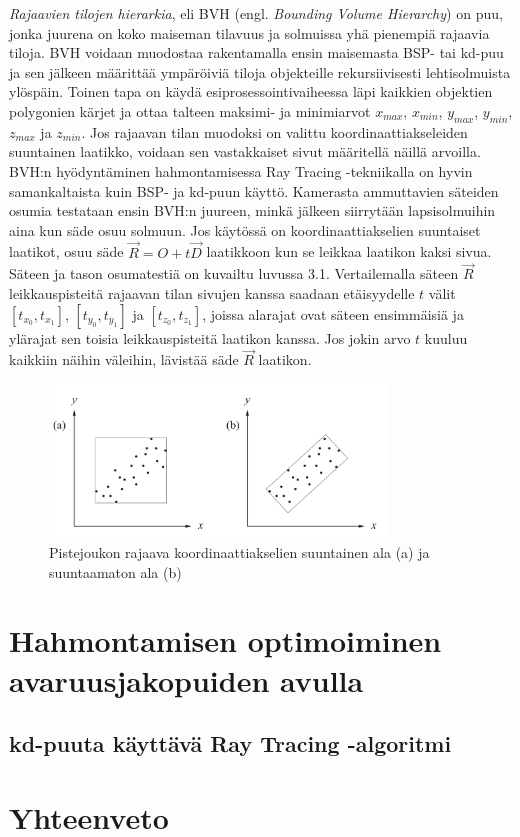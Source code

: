 \documentclass[a4paper, 12pt, titlepage]{article}
\begin{document}
\emph{Rajaavien tilojen hierarkia}, eli BVH (engl. \emph{Bounding Volume Hierarchy}) on puu, jonka juurena on koko maiseman tilavuus ja solmuissa yhä pienempiä rajaavia tiloja. BVH voidaan muodostaa rakentamalla ensin maisemasta BSP- tai kd-puu ja sen jälkeen määrittää ympäröiviä tiloja objekteille rekursiivisesti lehtisolmuista ylöspäin. \citep{hughes} Toinen tapa on käydä esiprosessointivaiheessa läpi kaikkien objektien polygonien kärjet ja ottaa talteen maksimi- ja minimiarvot $x_{max}$, $x_{min}$, $y_{max}$, $y_{min}$, $z_{max}$ ja $z_{min}$. Jos rajaavan tilan muodoksi on valittu koordinaattiakseleiden suuntainen laatikko, voidaan sen vastakkaiset sivut määritellä näillä arvoilla. \citep[.]{janke}\\

BVH:n hyödyntäminen hahmontamisessa Ray Tracing -tekniikalla on hyvin samankaltaista kuin BSP- ja kd-puun käyttö. Kamerasta ammuttavien säteiden osumia testataan ensin BVH:n juureen, minkä jälkeen siirrytään lapsisolmuihin aina kun säde osuu solmuun. Jos käytössä on koordinaattiakselien suuntaiset laatikot, osuu säde $\vec{R}=O+t\vec{D}$ laatikkoon kun se leikkaa laatikon kaksi sivua. Säteen ja tason osumatestiä on kuvailtu luvussa 3.1. Vertailemalla säteen $\vec{R}$ leikkauspisteitä rajaavan tilan sivujen kanssa saadaan etäisyydelle $t$ välit $[t_{x_0}, t_{x_1}]$, $[t_{y_0}, t_{y_1}]$ ja $[t_{z_0}, t_{z_1}]$, joissa alarajat ovat säteen ensimmäisiä ja ylärajat sen toisia leikkauspisteitä laatikon kanssa. Jos jokin arvo $t$ kuuluu kaikkiin näihin väleihin, lävistää säde $\vec{R}$ laatikon. \citep[.]{janke}

\begin{figure}
 \centering 
 \includegraphics[width=0.8\textwidth]{img/bvh1.png}
 \vspace{0.4cm}
 \caption{Pistejoukon rajaava koordinaattiakselien suuntainen ala (a) ja suuntaamaton ala (b) \citep{lengyel}}%
 \label{bvh1}
\end{figure}


\newpage
\section{Hahmontamisen optimoiminen avaruusjakopuiden avulla}
\subsection{kd-puuta käyttävä Ray Tracing -algoritmi}


\section{Yhteenveto}


\clearpage

\listofalgorithms
\end{document}
